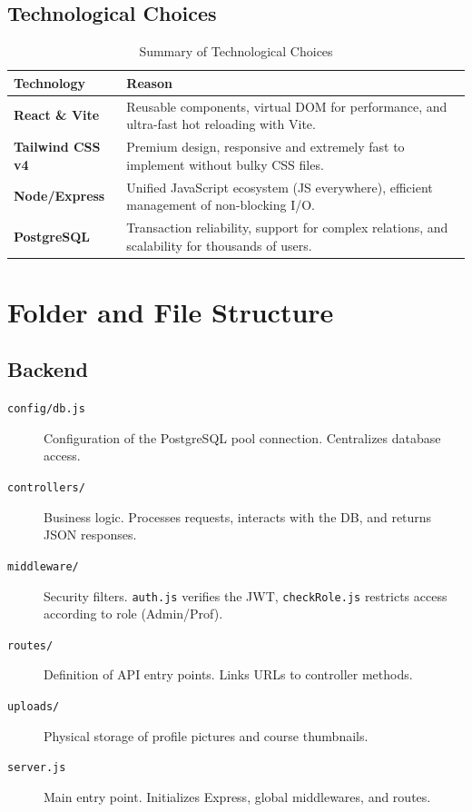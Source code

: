 \documentclass[12pt,a4paper]{article}
\begin{document}
\subsection{Technological Choices}
\begin{table}[h]
    \centering
    \begin{tabularx}{\textwidth}{l X}
        \toprule
        \textbf{Technology} & \textbf{Reason} \\
        \midrule
        \textbf{React \& Vite} & Reusable components, virtual DOM for performance, and ultra-fast hot reloading with Vite. \\
        \textbf{Tailwind CSS v4} & Premium design, responsive and extremely fast to implement without bulky CSS files. \\
        \textbf{Node/Express} & Unified JavaScript ecosystem (JS everywhere), efficient management of non-blocking I/O. \\
        \textbf{PostgreSQL} & Transaction reliability, support for complex relations, and scalability for thousands of users. \\
        \bottomrule
    \end{tabularx}
    \caption{Summary of Technological Choices}
\end{table}

\section{Folder and File Structure}
\subsection{Backend}
\begin{description}
    \item[\texttt{config/db.js}] Configuration of the PostgreSQL pool connection. Centralizes database access.
    \item[\texttt{controllers/}] Business logic. Processes requests, interacts with the DB, and returns JSON responses.
    \item[\texttt{middleware/}] Security filters. \texttt{auth.js} verifies the JWT, \texttt{checkRole.js} restricts access according to role (Admin/Prof).
    \item[\texttt{routes/}] Definition of API entry points. Links URLs to controller methods.
    \item[\texttt{uploads/}] Physical storage of profile pictures and course thumbnails.
    \item[\texttt{server.js}] Main entry point. Initializes Express, global middlewares, and routes.
\end{description}
\end{document}
